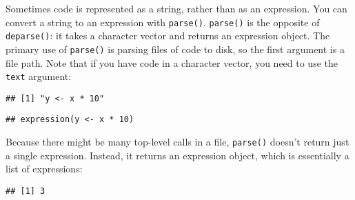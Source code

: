 Sometimes code is represented as a string, rather than as an expression.
You can convert a string to an expression with \texttt{parse()}.
\texttt{parse()} is the opposite of \texttt{deparse()}: it takes a
character vector and returns an expression object. The primary use of
\texttt{parse()} is parsing files of code to disk, so the first argument
is a file path. Note that if you have code in a character vector, you
need to use the \texttt{text} argument: 

\begin{Shaded}
\begin{Highlighting}[]
\StringTok{ }\StringTok{ }\OperatorTok{*}\StringTok{ }\NormalTok{)}
\end{Highlighting}
\end{Shaded}

\begin{verbatim}
## [1] "y <- x * 10"
\end{verbatim}

\begin{Shaded}
\begin{Highlighting}[]
\NormalTok{(} 
\end{Highlighting}
\end{Shaded}

\begin{verbatim}
## expression(y <- x * 10)
\end{verbatim}

Because there might be many top-level calls in a file, \texttt{parse()}
doesn't return just a single expression. Instead, it returns an
expression object, which is essentially a list of expressions:

\begin{Shaded}
\begin{Highlighting}[]
\StringTok{ }\NormalTok{(} \NormalTok{(}
\NormalTok{))}
\end{Highlighting}
\end{Shaded}

\begin{verbatim}
## [1] 3
\end{verbatim}

